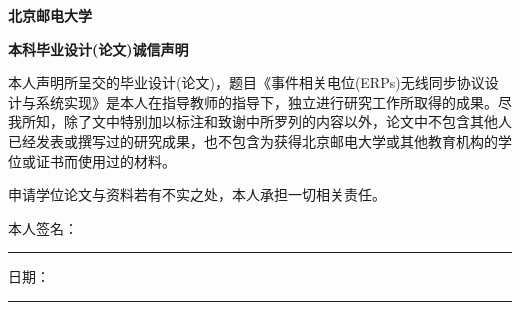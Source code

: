 \begin{center}
\textbf{\songti{}北京邮电大学}  
\end{center}

\begin{center}
\textbf{\songti{} 本科毕业设计(论文)诚信声明}
\end{center}
\songti{}

本人声明所呈交的毕业设计(论文)，题目《事件相关电位(ERPs)无线同步协议设计与系统实现》是本人在指导教师的指导下，独立进行研究工作所取得的成果。尽我所知，除了文中特别加以标注和致谢中所罗列的内容以外，论文中不包含其他人已经发表或撰写过的研究成果，也不包含为获得北京邮电大学或其他教育机构的学位或证书而使用过的材料。

申请学位论文与资料若有不实之处，本人承担一切相关责任。 \newline 

\indent 本人签名：\rule[-2pt]{4cm}{0.5pt}\quad 日期：\rule[-2pt]{4cm}{0.5pt}

